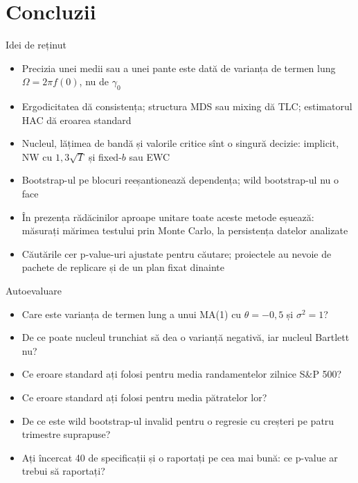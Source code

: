 \section{Concluzii}

\begin{frame}{Idei de reținut}
\itemsize{\small}
\begin{itemize}
    \item Precizia unei medii sau a unei pante este dată de varianța de termen lung $\Omega = 2\pi f(0)$, nu de $\gamma_0$
    \item Ergodicitatea dă consistența; structura MDS sau mixing dă TLC; estimatorul HAC dă eroarea standard
    \item Nucleul, lățimea de bandă și valorile critice sînt o singură decizie: implicit, NW cu $1{,}3\sqrt{T}$ și fixed-$b$ sau EWC
    \item Bootstrap-ul pe blocuri reeșantionează dependența; wild bootstrap-ul nu o face
    \item În prezența rădăcinilor aproape unitare toate aceste metode eșuează: măsurați mărimea testului prin Monte Carlo, la persistența datelor analizate
    \item Căutările cer p-value-uri ajustate pentru căutare; proiectele au nevoie de pachete de replicare și de un plan fixat dinainte
\end{itemize}
\end{frame}

\begin{frame}{Autoevaluare}
\itemsize{\small}
\begin{itemize}
    \item Care este varianța de termen lung a unui MA(1) cu $\theta = -0{,}5$ și $\sigma^2 = 1$?
    \item De ce poate nucleul trunchiat să dea o varianță negativă, iar nucleul Bartlett nu?
    \item Ce eroare standard ați folosi pentru media randamentelor zilnice S\&P 500?
    \item Ce eroare standard ați folosi pentru media pătratelor lor?
    \item De ce este wild bootstrap-ul invalid pentru o regresie cu creșteri pe patru trimestre suprapuse?
    \item Ați încercat 40 de specificații și o raportați pe cea mai bună: ce p-value ar trebui să raportați?
\end{itemize}
\end{frame}


